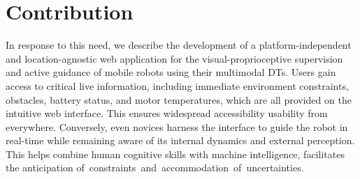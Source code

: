 \documentclass[conference]{IEEEtran}
\begin{document}
\section{Contribution}
In response to this need, we describe the development of a platform-independent and location-agnostic web application for the visual-proprioceptive supervision and active guidance of mobile robots
using their multimodal DTs. 
Users gain access to critical live information, including immediate environment constraints, obstacles, battery status, and motor temperatures, which are all provided on the intuitive web interface. This ensures widespread accessibility usability from everywhere. Conversely, even novices  harness the interface to guide the robot in real-time while remaining aware of its internal dynamics and external perception. This helps combine human cognitive skills with machine intelligence, facilitates the anticipation \mbox{of constraints and accommodation of uncertainties.}

\end{document}
